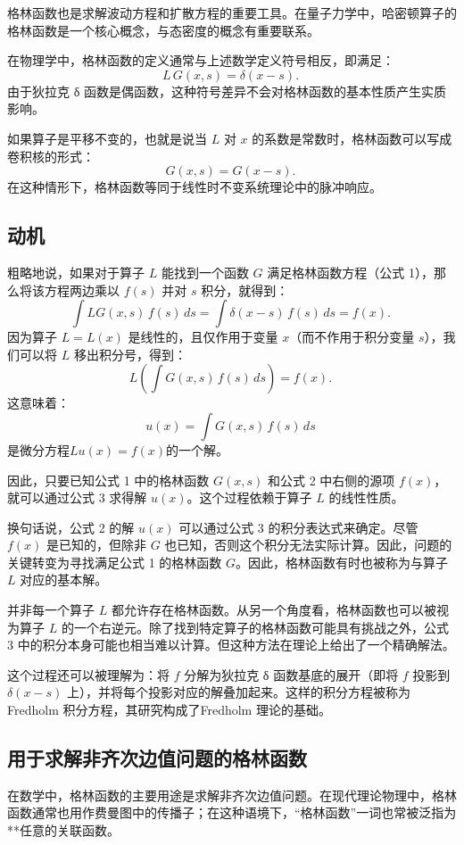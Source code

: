 格林函数也是求解波动方程和扩散方程的重要工具。在量子力学中，哈密顿算子的格林函数是一个核心概念，与态密度的概念有重要联系。

在物理学中，格林函数的定义通常与上述数学定义符号相反，即满足：
$$
L\,G(x, s) = \delta(x - s).~
$$
由于狄拉克 δ 函数是偶函数，这种符号差异不会对格林函数的基本性质产生实质影响。

如果算子是平移不变的，也就是说当 $L$ 对 $x$ 的系数是常数时，格林函数可以写成卷积核的形式：
$$
G(x, s) = G(x - s).~
$$
在这种情形下，格林函数等同于线性时不变系统理论中的脉冲响应。
\subsection{动机}
粗略地说，如果对于算子 $L$ 能找到一个函数 $G$ 满足格林函数方程（公式 1），那么将该方程两边乘以 $f(s)$ 并对 $s$ 积分，就得到：
$$
\int L G(x, s)\, f(s)\, ds = \int \delta(x - s)\, f(s)\, ds = f(x).~
$$
因为算子 $L = L(x)$ 是线性的，且仅作用于变量 $x$（而不作用于积分变量 $s$），我们可以将 $L$ 移出积分号，得到：
$$
L\left(\int G(x, s)\, f(s)\, ds\right) = f(x).~
$$
这意味着：
$$
u(x) = \int G(x, s)\, f(s)\, ds~
$$
是微分方程$Lu(x) = f(x)$的一个解。

因此，只要已知公式 1 中的格林函数 $G(x, s)$ 和公式 2 中右侧的源项 $f(x)$，就可以通过公式 3 求得解 $u(x)$。这个过程依赖于算子 $L$ 的线性性质。

换句话说，公式 2 的解 $u(x)$ 可以通过公式 3 的积分表达式来确定。尽管 $f(x)$ 是已知的，但除非 $G$ 也已知，否则这个积分无法实际计算。因此，问题的关键转变为寻找满足公式 1 的格林函数 $G$。因此，格林函数有时也被称为与算子 $L$ 对应的基本解。

并非每一个算子 $L$ 都允许存在格林函数。从另一个角度看，格林函数也可以被视为算子 $L$ 的一个右逆元。除了找到特定算子的格林函数可能具有挑战之外，公式 3 中的积分本身可能也相当难以计算。但这种方法在理论上给出了一个精确解法。

这个过程还可以被理解为：将 $f$ 分解为狄拉克 δ 函数基底的展开（即将 $f$ 投影到 $\delta(x - s)$ 上），并将每个投影对应的解叠加起来。这样的积分方程被称为Fredholm 积分方程，其研究构成了Fredholm 理论的基础。
\subsection{用于求解非齐次边值问题的格林函数}
在数学中，格林函数的主要用途是求解非齐次边值问题。在现代理论物理中，格林函数通常也用作费曼图中的传播子；在这种语境下，“格林函数”一词也常被泛指为**任意的关联函数。
